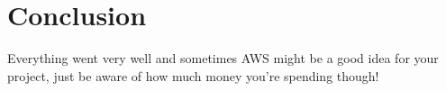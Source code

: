 \chapter{Conclusion}
Everything went very well and sometimes AWS might be a good idea for your project, just be aware of how much money you're spending though!